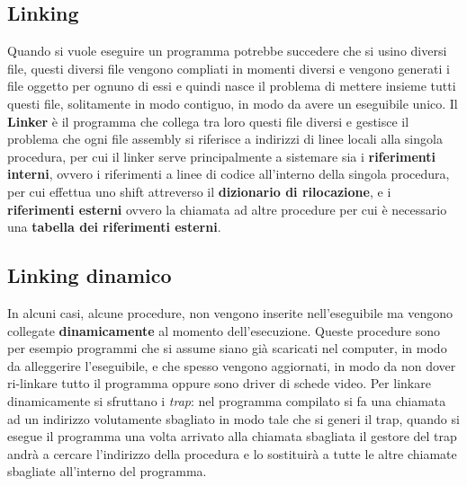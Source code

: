 \documentclass{article}
\begin{document}
\subsection{Linking}
Quando si vuole eseguire un programma potrebbe succedere che si usino diversi file, questi diversi file vengono compliati in momenti diversi e vengono generati i file oggetto per ognuno di essi e quindi nasce il problema di mettere insieme tutti questi file, solitamente in modo contiguo, in modo da avere un eseguibile unico. Il \textbf{Linker} è il programma che collega tra loro questi file diversi e gestisce il problema che ogni file assembly si riferisce a indirizzi di linee locali alla singola procedura, per cui il linker serve principalmente a sistemare sia i \textbf{riferimenti interni}, ovvero i riferimenti a linee di codice all'interno della singola procedura, per cui effettua uno shift attreverso il \textbf{dizionario di rilocazione}, e i \textbf{riferimenti esterni} ovvero la chiamata ad altre procedure per cui è necessario una \textbf{tabella dei riferimenti esterni}. 
\subsection{Linking dinamico} In alcuni casi, alcune procedure, non vengono inserite nell'eseguibile ma vengono collegate \textbf{dinamicamente} al momento dell'esecuzione. Queste procedure sono per esempio programmi che si assume siano già scaricati nel computer, in modo da alleggerire l'eseguibile, e che spesso vengono aggiornati, in modo da non dover ri-linkare tutto il programma oppure sono driver di schede video. Per linkare dinamicamente si sfruttano i \textit{trap}: nel programma compilato si fa una chiamata ad un indirizzo volutamente sbagliato in modo tale che si generi il trap, quando si esegue il programma una volta arrivato alla chiamata sbagliata il gestore del trap andrà a cercare l'indirizzo della procedura e lo sostituirà a tutte le altre chiamate sbagliate all'interno del programma. 
\end{document}
